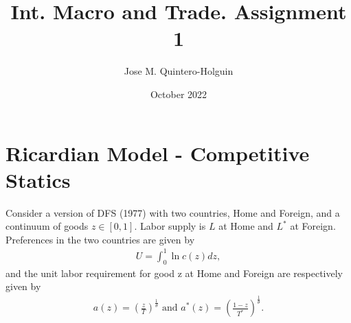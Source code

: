\documentclass{article}
\title{Int. Macro and Trade. Assignment 1}
\author{Jose M. Quintero-Holguin}
\date{October 2022}
\begin{document}
\maketitle

\section{Ricardian Model - Competitive Statics}
Consider a version of DFS (1977) with two countries, Home and Foreign, and a continuum of goods $z \in[0,1]$. Labor supply is $L$ at Home and $L^*$ at Foreign. Preferences in the two countries are given by
    \begin{align*}
    U=\int_0^1 \ln c(z) dz,
    \end{align*}
and the unit labor requirement for good $\mathrm{z}$ at Home and Foreign are respectively given by
    \begin{align*}
    a(z)=\left(\frac{z}{T}\right)^{\frac{1}{\theta}} \text { and } a^*(z)=\left(\frac{1-z}{T^*}\right)^{\frac{1}{\theta}}.
    \end{align*}
\end{document}
